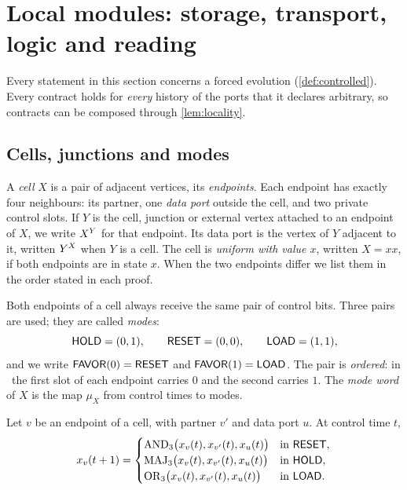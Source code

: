 \section{Local modules: storage, transport, logic and reading}\label{sec:modules}

Every statement in this section concerns a forced evolution (\cref{def:controlled}). Every
contract holds for \emph{every} history of the ports that it declares arbitrary, so contracts can be
composed through \cref{lem:locality}.

\subsection{Cells, junctions and modes}

\begin{definition}\label{def:cell}
A \emph{cell} $X$ is a pair of adjacent vertices, its \emph{endpoints}. Each endpoint has exactly
four neighbours: its partner, one \emph{data port} outside the cell, and two private control slots.
If $Y$ is the cell, junction or external vertex attached to an endpoint of $X$, we write $X^{Y}$
for that endpoint. Its data port is the vertex of $Y$ adjacent to it, written $Y^{X}$ when $Y$ is a
cell. The cell is \emph{uniform with value $x$}, written $X=xx$, if both endpoints are in state $x$.
When the two endpoints differ we list them in the order stated in each proof.
\end{definition}

Both endpoints of a cell always receive the same pair of control bits. Three pairs are used; they
are called \emph{modes}:
\[
\textsf{HOLD}=(0,1),\qquad \textsf{RESET}=(0,0),\qquad \textsf{LOAD}=(1,1),
\]
and we write $\textsf{FAVOR}(0)=\textsf{RESET}$ and $\textsf{FAVOR}(1)=\textsf{LOAD}$.
The pair is \emph{ordered}: in \HOLD\ the first slot of each endpoint carries $0$ and the second
carries $1$. The \emph{mode word} of $X$ is the map $\mu_X$ from control times to modes.

\begin{lemma}[Modes]\label{lem:modes}
Let $v$ be an endpoint of a cell, with partner $v'$ and data port $u$. At control time $t$,
\[
x_v(t+1)=\begin{cases}
\operatorname{AND}_3\bigl(x_v(t),x_{v'}(t),x_u(t)\bigr)&\text{in }\textsf{RESET},\\
\operatorname{MAJ}_3\bigl(x_v(t),x_{v'}(t),x_u(t)\bigr)&\text{in }\textsf{HOLD},\\
\operatorname{OR}_3\bigl(x_v(t),x_{v'}(t),x_u(t)\bigr)&\text{in }\textsf{LOAD}.
\end{cases}
\]
\end{lemma}

